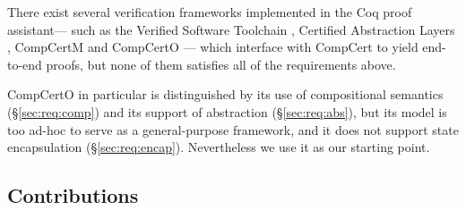 \documentclass[acmsmall,screen,review,anonymous]{acmart}
\begin{document}
There exist several verification frameworks
implemented in the Coq proof assistant---%
such as the Verified Software Toolchain \cite{vst}, Certified Abstraction Layers \cite{popl15},
CompCertM \cite{compcertm} and
CompCertO \citep{compcerto}---%
which interface with CompCert to yield end-to-end proofs,
but none of them satisfies all of
the requirements above.

CompCertO in particular
is distinguished by its use of compositional semantics (\S\ref{sec:req:comp})
and its support of abstraction (\S\ref{sec:req:abs}),
but its model is too ad-hoc to serve as a general-purpose framework,
and it does not support state encapsulation (\S\ref{sec:req:encap}).
Nevertheless we use it as our starting point.



\subsection{Contributions} %
\end{document}
